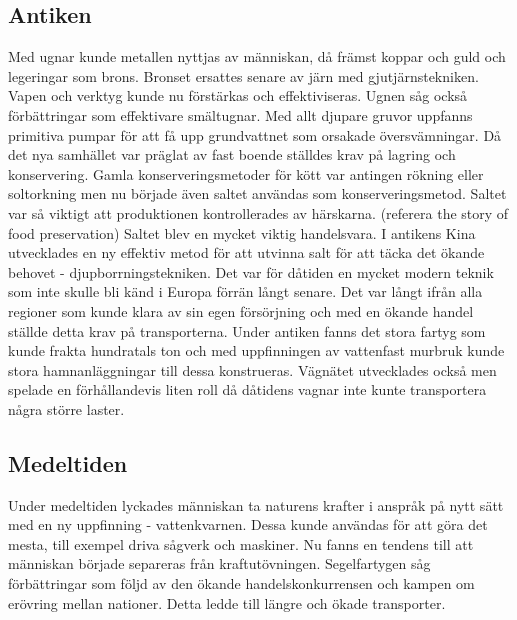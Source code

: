 \subsection{Antiken}
Med ugnar kunde metallen nyttjas av människan, då främst koppar och guld och legeringar som brons. Bronset ersattes senare av järn med gjutjärnstekniken. Vapen och verktyg kunde nu förstärkas och effektiviseras. Ugnen såg också förbättringar som effektivare smältugnar. Med allt djupare gruvor uppfanns primitiva pumpar för att få upp grundvattnet som orsakade översvämningar. \citep{denskapande}
\newline
\newline 
Då det nya samhället var präglat av fast boende ställdes krav på lagring och konservering. \citep{denskapande}
\newline
\newline
Gamla konserveringsmetoder för kött var antingen rökning eller soltorkning men nu började även saltet användas som konserveringsmetod. Saltet var så viktigt att produktionen kontrollerades av härskarna. 
(referera the story of food preservation) 
\newline
\newline
Saltet blev en mycket viktig handelsvara. I antikens Kina utvecklades en ny effektiv metod för att utvinna salt för att täcka det ökande behovet - djupborrningstekniken. Det var för dåtiden en mycket modern teknik som inte skulle bli känd i Europa förrän långt senare. \citep{denskapande}
\newline
\newline
Det var långt ifrån alla regioner som kunde klara av sin egen försörjning och med en ökande handel ställde detta krav på transporterna. Under antiken fanns det stora fartyg som kunde frakta hundratals ton och med uppfinningen av vattenfast murbruk kunde stora hamnanläggningar till dessa konstrueras. Vägnätet utvecklades också men spelade en förhållandevis liten roll då dåtidens vagnar inte kunte transportera några större laster. \citep{denskapande}

\subsection{Medeltiden}    
Under medeltiden lyckades människan ta naturens krafter i anspråk på nytt sätt med en ny uppfinning - vattenkvarnen. Dessa kunde användas för att göra det mesta, till exempel driva sågverk och maskiner. Nu fanns en tendens till att människan började separeras från kraftutövningen. \citep{medeltiden}
\newline
\newline
Segelfartygen såg förbättringar som följd av den ökande handelskonkurrensen och kampen om erövring mellan nationer. Detta ledde till längre och ökade transporter. \citep{denskapande}

